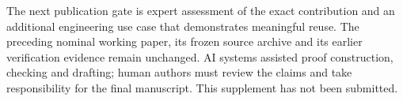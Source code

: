 \documentclass[10pt]{article}
\begin{document}
The next publication gate is expert assessment of the exact contribution and
an additional engineering use case that demonstrates meaningful reuse.
The preceding nominal working paper, its frozen source archive and its earlier
verification evidence remain unchanged. AI systems assisted proof construction,
checking and drafting; human authors must review the claims and take responsibility
for the final manuscript. This supplement has not been submitted.
\end{document}
